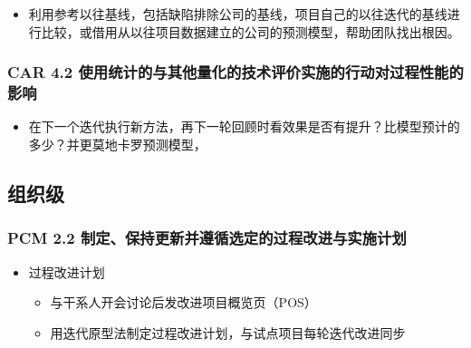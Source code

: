 \begin{itemize}
\tightlist
\item
  利用参考以往基线，包括缺陷排除公司的基线，项目自己的以往迭代的基线进行比较，或借用从以往项目数据建立的公司的预测模型，帮助团队找出根因。
\end{itemize}

\hypertarget{car-4.2-ux4f7fux7528ux7edfux8ba1ux7684ux4e0eux5176ux4ed6ux91cfux5316ux7684ux6280ux672fux8bc4ux4ef7ux5b9eux65bdux7684ux884cux52a8ux5bf9ux8fc7ux7a0bux6027ux80fdux7684ux5f71ux54cd}{%
\subsubsection{CAR 4.2
使用统计的与其他量化的技术评价实施的行动对过程性能的影响}\label{car-4.2-ux4f7fux7528ux7edfux8ba1ux7684ux4e0eux5176ux4ed6ux91cfux5316ux7684ux6280ux672fux8bc4ux4ef7ux5b9eux65bdux7684ux884cux52a8ux5bf9ux8fc7ux7a0bux6027ux80fdux7684ux5f71ux54cd}}

\begin{itemize}
\tightlist
\item
  在下一个迭代执行新方法，再下一轮回顾时看效果是否有提升？比模型预计的多少？并更莫地卡罗预测模型，
\end{itemize}

\hypertarget{ux7ec4ux7ec7ux7ea7}{%
\subsection{组织级}\label{ux7ec4ux7ec7ux7ea7}}

\hypertarget{pcm-2.2-ux5236ux5b9aux4fddux6301ux66f4ux65b0ux5e76ux9075ux5faaux9009ux5b9aux7684ux8fc7ux7a0bux6539ux8fdbux4e0eux5b9eux65bdux8ba1ux5212}{%
\subsubsection{PCM 2.2
制定、保持更新并遵循选定的过程改进与实施计划}\label{pcm-2.2-ux5236ux5b9aux4fddux6301ux66f4ux65b0ux5e76ux9075ux5faaux9009ux5b9aux7684ux8fc7ux7a0bux6539ux8fdbux4e0eux5b9eux65bdux8ba1ux5212}}

\begin{itemize}
\tightlist
\item
  过程改进计划

  \begin{itemize}
  \tightlist
  \item
    与干系人开会讨论后发改进项目概览页（POS）
  \item
    用迭代原型法制定过程改进计划，与试点项目每轮迭代改进同步
  \end{itemize}
\end{itemize}

